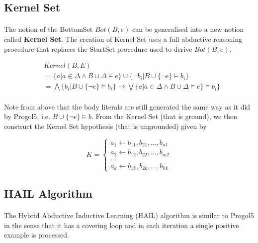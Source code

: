 \documentclass{article}
\theoremstyle{plain}
\theoremstyle{definition}
\begin{document}
\begin{multicols}{2}
\subsection{Kernel Set}

\paragraph{} The notion of the BottomSet $Bot(B, e)$ can be generalised into a new notion called \textbf{Kernel Set}. The creation of Kernel Set uses a full abductive reasoning procedure that replaces the StartSet procedure used to derive $Bot(B, e)$. 

{\footnotesize
\begin{align*}
& Kernel(B, E) \\
&= \{a | a \in \Delta \land B \cup \Delta \models e\} \cup \{\lnot b_i | B \cup \{\lnot e\} \models b_i\} \\
&= \bigwedge \{b_i | B \cup \{\lnot e\} \models b_i\} \rightarrow \bigvee \{a | a \in \Delta \land B \cup \Delta \models e\} \models b_i\}
\end{align*}}

\paragraph{} Note from above that the body literals are still generated the same way as it did by Progol5, i.e. $B \cup \{\lnot e\} \models b$. From the Kernel Set (that is ground), we then construct the Kernel Set hypothesis (that is ungrounded) given by

\[ 
K = \begin{cases}
a_1 \leftarrow b_{11}, b_{21}, ..., b_{n1}\\
a_2 \leftarrow b_{12}, b_{22}, ..., b_{m2}\\
...\\
a_k \leftarrow b_{1k}, b_{2k}, ..., b_{hk}
\end{cases}
\]

\subsection{HAIL Algorithm}

\paragraph{} The Hybrid Abductive Inductive Learning (HAIL) algorithm is similar to Progol5 in the sense that it has a covering loop and in each iteration a single positive example is processed.


\end{multicols}
\end{document}
